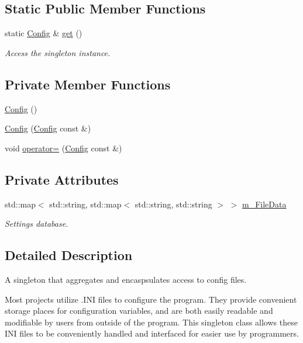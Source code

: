 \subsection*{Static Public Member Functions}
\begin{DoxyCompactItemize}
\item 
static \hyperlink{class_config}{Config} \& \hyperlink{class_config_a5154d96acc76c1fae8c564f3705fe197}{get} ()
\begin{DoxyCompactList}\small\item\em Access the singleton instance. \end{DoxyCompactList}\end{DoxyCompactItemize}
\subsection*{Private Member Functions}
\begin{DoxyCompactItemize}
\item 
\hyperlink{class_config_abd0c571c116924871e30444b192b792a}{Config} ()
\item 
\hyperlink{class_config_a43fa97921860bb03437dde7461310459}{Config} (\hyperlink{class_config}{Config} const \&)
\item 
void \hyperlink{class_config_a9b6a7f8721a8789102928869dc1e186c}{operator=} (\hyperlink{class_config}{Config} const \&)
\end{DoxyCompactItemize}
\subsection*{Private Attributes}
\begin{DoxyCompactItemize}
\item 
std\+::map$<$ std\+::string, std\+::map$<$ std\+::string, std\+::string $>$ $>$ \hyperlink{class_config_a5c864239797e10af1a62b292d7ededad}{m\+\_\+\+File\+Data}
\begin{DoxyCompactList}\small\item\em Settings database. \end{DoxyCompactList}\end{DoxyCompactItemize}


\subsection{Detailed Description}
A singleton that aggregates and encaspsulates access to config files. 

Most projects utilize .I\+NI files to configure the program. They provide convenient storage places for configuration variables, and are both easily readable and modifiable by users from outside of the program. This singleton class allows these I\+NI files to be conveniently handled and interfaced for easier use by programmers.

